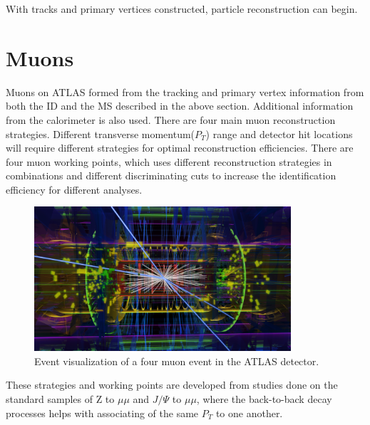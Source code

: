 With tracks and primary vertices constructed, particle reconstruction can begin. 

\section{Muons}
\label{sec:Muon}
Muons on ATLAS formed from the tracking and primary vertex information from both the ID and the MS described in the above section. Additional information from the calorimeter is also used. There are four main muon reconstruction strategies. Different transverse momentum($P_{T}$) range and detector hit locations will require different strategies for optimal reconstruction efficiencies. There are four muon working points, which uses different reconstruction strategies in combinations and different discriminating cuts to increase the identification efficiency for different analyses.

\begin{figure}[!htb]
    \begin{center}
        \includegraphics[width=0.85\textwidth]{figures/common_ana/Muon}
        \caption{        
            Event visualization of a four muon event in the ATLAS detector\cite{ATLAS:1697053}.
        }
        \label{fig:muon}
    \end{center}
\end{figure}

These strategies and working points are developed from studies done on the standard samples of Z to $\mu \mu $ and $J/\Psi$ to $\mu \mu$, where the back-to-back decay processes helps with associating of the same $P_{T}$ to one another. 

